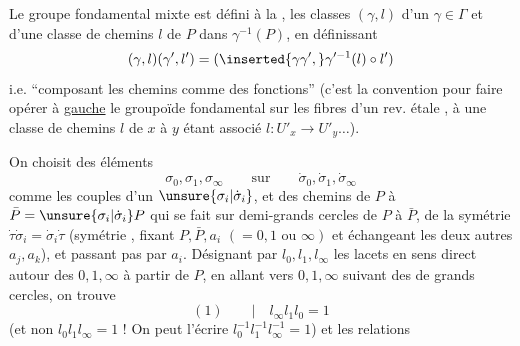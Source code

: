 Le groupe fondamental mixte est défini à la ,  les classes $(\gamma,l)$ d'un $\gamma\in\Gamma$ et d'une classe de chemins $l$ de $P$ dans $\gamma^{-1}(P)$, en définissant
\[
(\gamma,l)(\gamma',l')=(\inserted{\gamma\gamma',}\gamma'^{-1}(l)\circ l')
\]
i.e. ``composant les chemins comme des fonctions'' (c'est la convention pour faire opérer à \uline{gauche} le groupoïde fondamental sur les fibres d'un rev. étale , à une classe de chemins $l$ de $x$ à $y$ étant associé $l:U'_x\longrightarrow U'_y\ldots$).

On choisit des éléments
\[
\sigma_0,\sigma_1,\sigma_\infty\qquad\text{sur}\qquad\dot\sigma_0,\dot\sigma_1,\dot\sigma_\infty
\]
comme les couples d'un $\unsure{\sigma_i|\dot\sigma_i}$, et des chemins  de $P$ à $\bar P=\unsure{\sigma_i|\dot\sigma_i}P$ qui se fait sur   demi-grands cercles de $P$ à $\bar P$,    de la symétrie $\dot\tau\dot\sigma_i=\dot\sigma_i\dot\tau$ (symétrie , fixant $P,\bar P,a_i$ $(=0,1\text{ ou }\infty)$ et échangeant les deux autres $a_j,a_k$), et  passant pas par $a_i$.  Désignant par $l_0,l_1,l_\infty$  les lacets en sens direct autour des $0,1,\infty$ à partir de $P$, en allant vers $0,1,\infty$ suivant des  de grands cercles, on trouve
\[
(1)\qquad\big|\quad l_\infty l_1l_0=1
\]
(et non $l_0l_1l_\infty=1$ !  On peut l'écrire $l_0^{-1}l_1^{-1}l_\infty^{-1}=1$)
et les relations
